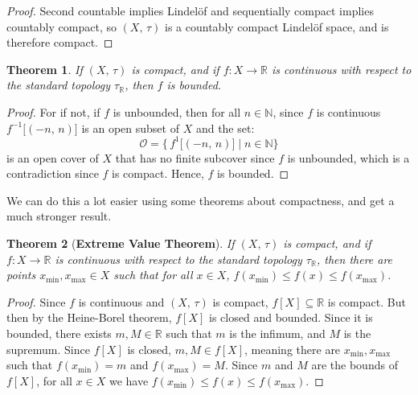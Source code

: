 \documentclass{article}
\theoremstyle{plain}
\newtheorem{theorem}{Theorem}[section]
\theoremstyle{normal}
\begin{document}
        \begin{proof}
            Second countable implies Lindel\"{o}f and sequentially compact
            implies countably compact, so $(X,\,\tau)$ is a countably compact
            Lindel\"{o}f space, and is therefore compact.
        \end{proof}
        \begin{theorem}
            If $(X,\,\tau)$ is compact, and if $f:X\rightarrow\mathbb{R}$ is
            continuous with respect to the standard topology
            $\tau_{\mathbb{R}}$, then $f$ is bounded.
        \end{theorem}
        \begin{proof}
            For if not, if $f$ is unbounded, then for all $n\in\mathbb{N}$,
            since $f$ is continuous
            $f^{-1}\big[(-n,\,n)]$ is an open subset of $X$ and the set:
            \begin{equation}
                \mathcal{O}=\Big\{\,f^{1}\big[(-n,\,n)\big]\;|\;n\in\mathbb{N}
                    \Big\}
            \end{equation}
            is an open cover of $X$ that has no finite subcover since $f$ is
            unbounded, which is a contradiction since $f$ is compact. Hence,
            $f$ is bounded.
        \end{proof}
        We can do this a lot easier using some theorems about compactness, and
        get a much stronger result.
        \begin{theorem}[\textbf{Extreme Value Theorem}]
            If $(X,\,\tau)$ is compact, and if $f:X\rightarrow\mathbb{R}$ is
            continuous with respect to the standard topology
            $\tau_{\mathbb{R}}$, then there are points
            $x_{\textrm{min}},x_{\textrm{max}}\in{X}$ such that for all
            $x\in{X}$, $f(x_{\textrm{min}})\leq{f}(x)\leq{f}(x_{\textrm{max}})$.
        \end{theorem}
        \begin{proof}
            Since $f$ is continuous and $(X,\,\tau)$ is compact,
            $f[X]\subseteq\mathbb{R}$ is compact. But then by the Heine-Borel
            theorem, $f[X]$ is closed and bounded. Since it is bounded, there
            exists $m,M\in\mathbb{R}$ such that $m$ is the infimum, and
            $M$ is the supremum. Since $f[X]$ is closed, $m,M\in{f}[X]$, meaning
            there are $x_{\textrm{min}},x_{\textrm{max}}$ such that
            $f(x_{\textrm{min}})=m$ and $f(x_{\textrm{max}})=M$. Since
            $m$ and $M$ are the bounds of $f[X]$, for all
            $x\in{X}$ we have
            $f(x_{\textrm{min}})\leq{f}(x)\leq{f}(x_{\textrm{max}})$.
        \end{proof}
\end{document}
